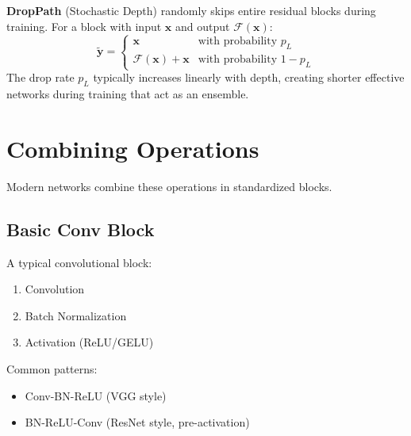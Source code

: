 \textbf{DropPath} (Stochastic Depth) \cite{huang2016deep} randomly skips entire residual blocks during training. For a block with input $\mathbf{x}$ and output $\mathcal{F}(\mathbf{x})$:
\begin{equation}
\tilde{\mathbf{y}} = \begin{cases} \mathbf{x} & \text{with probability } p_L \\ \mathcal{F}(\mathbf{x}) + \mathbf{x} & \text{with probability } 1 - p_L \end{cases}
\end{equation}
The drop rate $p_L$ typically increases linearly with depth, creating shorter effective networks during training that act as an ensemble.

\section{Combining Operations}

Modern networks combine these operations in standardized blocks.

\subsection{Basic Conv Block}

A typical convolutional block:
\begin{enumerate}
    \item Convolution
    \item Batch Normalization
    \item Activation (ReLU/GELU)
\end{enumerate}

Common patterns:
\begin{itemize}
    \item Conv-BN-ReLU (VGG style)
    \item BN-ReLU-Conv (ResNet style, pre-activation)
\end{itemize}

